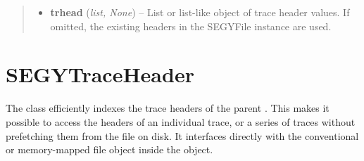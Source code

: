 \documentclass[letterpaper,10pt,english]{sphinxmanual}
\begin{document}
\begin{fulllineitems}
\begin{fulllineitems}
\begin{quote}
\begin{description}
\begin{itemize}
\item {} 
\textbf{trhead} (\emph{list, None}) -- List or list-like object of trace header values.  If omitted, the existing headers in the SEGYFile instance are used.

\end{itemize}

\end{description}\end{quote}

\end{fulllineitems}


\end{fulllineitems}



\section{SEGYTraceHeader}
\label{segyread:segytraceheader}
The {\hyperref[segyread:pygeo.segyread.SEGYTraceHeader]{}} class efficiently indexes the trace headers of the parent {\hyperref[segyread:pygeo.segyread.SEGYFile]{}}.  This makes it possible to access the headers of an individual trace, or a series of traces without prefetching them from the file on disk.  It interfaces directly with the conventional or memory-mapped file object inside the {\hyperref[segyread:pygeo.segyread.SEGYFile]{}} object.
\end{document}
